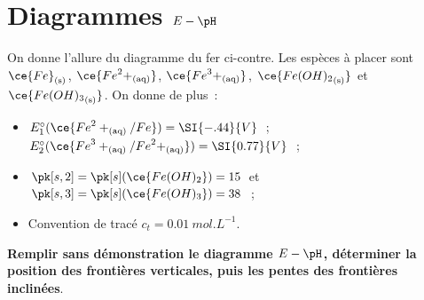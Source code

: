 \documentclass[a4paper, 10pt, final, garamond]{book}
\begin{document}
\setcounter{chapter}{23}


\chapter{Diagrammes $E-\pH$}

\begin{enumerate}[label=\sqenumi]
	\noindent
	\begin{minipage}[t]{.65\linewidth}
		On donne l'allure du diagramme du fer ci-contre. Les espèces à placer sont
		$\ce{Fe}_{\rm(s)}$, $\ce{{Fe}^2+_{\rm(aq)}}$, $\ce{{Fe}^3+_{\rm(aq)}}$,
		$\ce{{Fe(OH)_2}_{\rm(s)}}$ et $\ce{{Fe(OH)_3}_{\rm(s)}}$. On donne de plus~:
		\begin{itemize}
			\item $E_1^\circ(\ce{{Fe}^2+_{\rm(aq)}/Fe}) = \SI{-.44}{V}$~;
			      $E_2^\circ(\ce{{Fe}^3+_{\rm(aq)}/{Fe}^2+_{\rm(aq)}}) =
				      \SI{0.77}{V}$~;
			\item $\pk[s,2] = \pk[s](\ce{Fe(OH)_2}) = 15$ et $\pk[s,3] =
				      \pk[s](\ce{Fe(OH)_3}) = 38$~;
			\item Convention de tracé $c_t = \SI{0.01}{mol.L^{-1}}$.
		\end{itemize}
		\textbf{Remplir sans démonstration le diagramme $E-\pH$, déterminer la
			position des frontières verticales, puis les pentes des frontières
			inclinées}.
	\end{minipage}
	\hfill
	\begin{minipage}[t]{.35\linewidth}
		\vspace{-20pt}
		\begin{center}
\end{center}
\end{minipage}
\end{enumerate}
\end{document}
